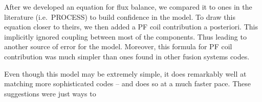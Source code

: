 After we developed an equation for flux balance, we compared it to ones in the literature (i.e.\ PROCESS) to build confidence in the model. To draw this equation closer to theirs, we then added a PF coil contribution a posteriori. This implicitly ignored coupling between most of the components. Thus leading to another source of error for the model. Moreover, this formula for PF coil contribution was much simpler than ones found in other fusion systems codes.

Even though this model may be extremely simple, it does remarkably well at matching more sophisticated codes -- and does so at a much faster pace. These suggestions were just ways to 

%
